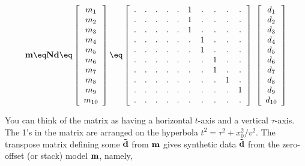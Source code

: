 \begin{equation}
{\bf m\eq Nd} \eq
 \left[ 
  \begin{array}{c}
   m_1 \\ 
   m_2 \\
   m_3 \\
   m_4 \\
   m_5 \\
   m_6 \\
   m_7 \\
   m_8 \\
   m_9 \\
   m_{10}
  \end{array}
 \right] 
\eq
 \left[ 
  \begin{array}{cccccccccc}
   .&.&.&.&.&1&.&.&.&. \\
   .&.&.&.&.&1&.&.&.&. \\
   .&.&.&.&.&1&.&.&.&. \\
   .&.&.&.&.&.&1&.&.&. \\
   .&.&.&.&.&.&1&.&.&. \\
   .&.&.&.&.&.&.&1&.&. \\
   .&.&.&.&.&.&.&1&.&. \\
   .&.&.&.&.&.&.&.&1&. \\
   .&.&.&.&.&.&.&.&.&1 \\
   .&.&.&.&.&.&.&.&.&.
  \end{array}
 \right] \;
 \left[ 
  \begin{array}{c}
   d_1 \\ 
   d_2 \\
   d_3 \\
   d_4 \\
   d_5 \\
   d_6 \\
   d_7 \\
   d_8 \\
   d_9 \\
   d_{10}
  \end{array}
 \right] 
 \label{eqn:NMOarray}
\end{equation}

You can think of the matrix as having a horizontal $t$-axis and
a vertical $\tau$-axis.
The 1's in the matrix are arranged on the hyperbola
$t^2=\tau^2+x_0^2/v^2$.
The transpose matrix defining some ${\bf \tilde d}$
from $\bold m$ gives synthetic data ${\bf \tilde d}$ from the zero-offset
(or stack) model $\bold m$, namely,

